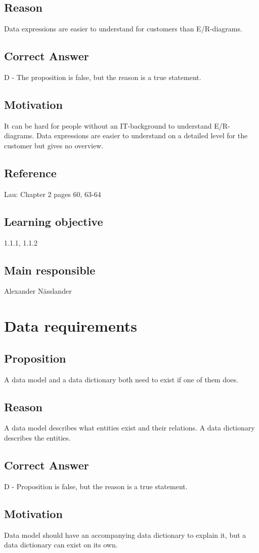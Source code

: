 \documentclass[a4paper]{article}
\begin{document}
\subsection*{Reason}
Data expressions are easier to understand for customers than E/R-diagrams. 
\subsection*{Correct Answer}
D - The proposition is false, but the reason is a true statement.
\subsection*{Motivation}
It can be hard for people without an IT-background to understand E/R-diagrams. Data expressions are easier to understand on a detailed level for the customer but gives no overview. 
\subsection*{Reference}
Lau: Chapter 2 pages 60, 63-64
\subsection*{Learning objective}
1.1.1, 1.1.2
\subsection*{Main responsible}
Alexander Nässlander


\section{Data requirements}
\subsection*{Proposition}
A data model and a data dictionary both need to exist if one of them does.
\subsection*{Reason}
A data model describes what entities exist and their relations. A data dictionary describes the entities.
\subsection*{Correct Answer}
D - Proposition is false, but the reason is a true statement.
\subsection*{Motivation}
Data model should have an accompanying data dictionary to explain it, but a data dictionary can exist on its own.
\end{document}
